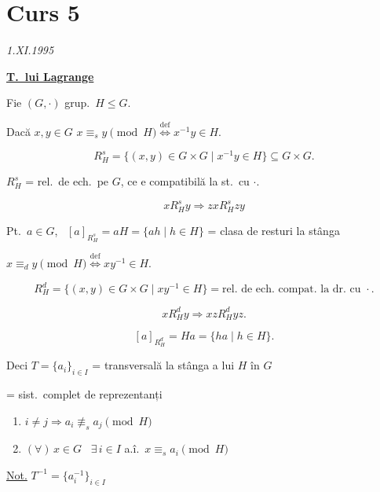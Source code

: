 \newpage
\section{Curs 5}

\begin{center}
\end{center}
\begin{flushright}
\textit{1.XI.1995}
\end{flushright}

\bigskip
\noindent\underline{\textbf{T.\ lui Lagrange}}

\bigskip
\noindent Fie $(G,\cdot)$ grup.\ $H\leq G$.

\noindent Dacă $x,y\in G$ \quad $x\equiv_s y \pmod H \overset{\text{def}}{\Longleftrightarrow} x^{-1}y\in H$.

\[
R_H^s = \{(x,y)\in G\times G \mid x^{-1}y\in H\} \subseteq G\times G.
\]

\noindent $R_H^s$ = rel.\ de ech.\ pe $G$, ce e compatibilă la st.\ cu $\cdot$.

\[
xR_H^s y \Rightarrow zxR_H^s zy
\]

\noindent Pt.\ $a\in G$, \ $[a]_{R_H^s} = aH = \{ah \mid h\in H\}$ = clasa de resturi la stânga

\bigskip
\noindent $x\equiv_d y \pmod H \overset{\text{def}}{\Longleftrightarrow} xy^{-1}\in H$.

\[
R_H^d = \{(x,y)\in G\times G \mid xy^{-1}\in H\} = \text{rel.\ de ech.\ compat.\ la dr.\ cu } \cdot.
\]

\[
xR_H^d y \Rightarrow xzR_H^d yz.
\]

\[
[a]_{R_H^d} = Ha = \{ha \mid h\in H\}.
\]

\bigskip
\noindent Deci $T=\{a_i\}_{i\in I}$ = transversală la stânga a lui $H$ în $G$

\noindent = sist.\ complet de reprezentanți

\begin{enumerate}
\item[1)] $i\neq j \Rightarrow a_i \not\equiv_s a_j \pmod H$
\item[2)] $(\forall)\, x\in G$ \ $\exists\, i\in I$ a.î.\ $x\equiv_s a_i \pmod H$
\end{enumerate}

\bigskip
\noindent\underline{Not.} $T^{-1} = \{a_i^{-1}\}_{i\in I}$

